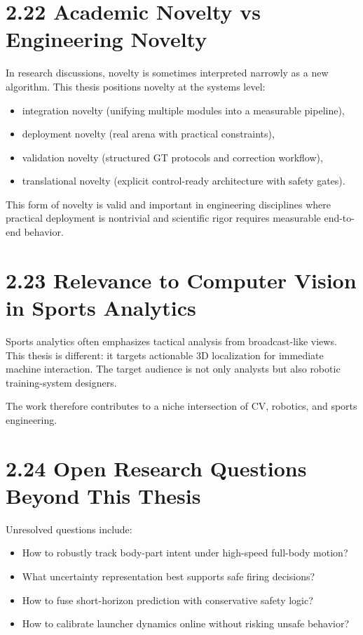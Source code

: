 \section{2.22 Academic Novelty vs Engineering Novelty}
In research discussions, novelty is sometimes interpreted narrowly as a new algorithm. This thesis positions novelty at the systems level:
\begin{itemize}
  \item integration novelty (unifying multiple modules into a measurable pipeline),
  \item deployment novelty (real arena with practical constraints),
  \item validation novelty (structured GT protocols and correction workflow),
  \item translational novelty (explicit control-ready architecture with safety gates).
\end{itemize}

This form of novelty is valid and important in engineering disciplines where practical deployment is nontrivial and scientific rigor requires measurable end-to-end behavior.

\section{2.23 Relevance to Computer Vision in Sports Analytics}
Sports analytics often emphasizes tactical analysis from broadcast-like views. This thesis is different: it targets actionable 3D localization for immediate machine interaction. The target audience is not only analysts but also robotic training-system designers.

The work therefore contributes to a niche intersection of CV, robotics, and sports engineering.

\section{2.24 Open Research Questions Beyond This Thesis}
Unresolved questions include:
\begin{itemize}
  \item How to robustly track body-part intent under high-speed full-body motion?
  \item What uncertainty representation best supports safe firing decisions?
  \item How to fuse short-horizon prediction with conservative safety logic?
  \item How to calibrate launcher dynamics online without risking unsafe behavior?
\end{itemize}

